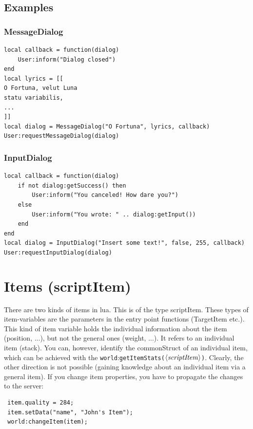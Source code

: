 \documentclass[a4paper,10pt,makeidx]{scrreprt}
\newcommand{\com}[2]{\index{#1}\texttt{#1(}#2\texttt{)}}
\newcommand{\comm}[1]{\index{#1}\texttt{#1}}
\newcommand{\var}[1]{$\left\langle \text{\emph{#1}} \right\rangle$}
\begin{document}
\section{Examples}
\subsection{MessageDialog}
\begin{verbatim}
local callback = function(dialog)
    User:inform("Dialog closed")
end
local lyrics = [[
O Fortuna, velut Luna
statu variabilis,
...
]]
local dialog = MessageDialog("O Fortuna", lyrics, callback)
User:requestMessageDialog(dialog)
\end{verbatim}

\subsection{InputDialog}
\begin{verbatim}
local callback = function(dialog)
    if not dialog:getSuccess() then
        User:inform("You canceled! How dare you?")
    else
        User:inform("You wrote: " .. dialog:getInput())
    end
end
local dialog = InputDialog("Insert some text!", false, 255, callback)
User:requestInputDialog(dialog)
\end{verbatim}



\chapter{Items (scriptItem)}
There are two kinds of items in lua. This is of the type scriptItem. These types of item-variables are the parameters in the entry point functions (TargetItem etc.).
This kind of item variable holds the individual information about the item (position, ...), but not the general ones (weight, ...). It refers to an individual item (stack). You can, however, identify the commonStruct of an individual item, which can be achieved with the \comm{world}:\com{getItemStats}{\var{scriptItem}}. Clearly, the other direction is not possible (gaining knowledge about an individual item via a general item). If you change item properties, you have to propagate the changes to the server:
\begin{verbatim}
 item.quality = 284;
 item.setData("name", "John's Item");
 world:changeItem(item);
\end{verbatim}
\end{document}

